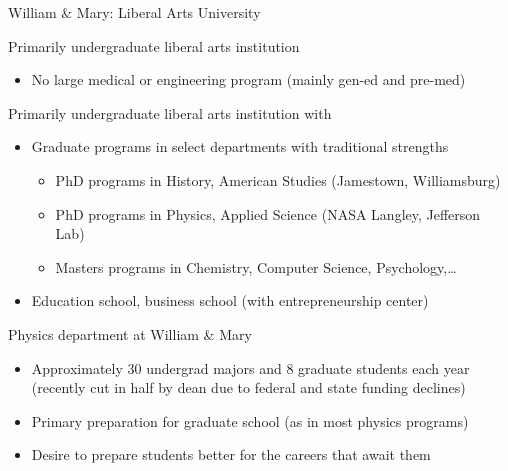 \documentclass[xcolor={dvipsnames},professionalfonts]{beamer}
\begin{document}
\begin{frame}{William \& Mary: Liberal Arts University}
 \begin{block}{Primarily undergraduate liberal arts institution}
  \begin{itemize}
   \item No large medical or engineering program (mainly gen-ed and pre-med)
  \end{itemize}
 \end{block}
 \begin{block}{Primarily undergraduate liberal arts institution with}
  \begin{itemize}
   \item Graduate programs in select departments with traditional strengths
    \begin{itemize}
     \item PhD programs in History, American Studies (Jamestown, Williamsburg)
     \item PhD programs in Physics, Applied Science (NASA Langley, Jefferson Lab)
     \item Masters programs in Chemistry, Computer Science, Psychology,\ldots
    \end{itemize}
   \item Education school, business school (with entrepreneurship center)
  \end{itemize}
 \end{block}
 \begin{block}{Physics department at William \& Mary}
  \begin{itemize}
   \item Approximately 30 undergrad majors and 8 graduate students each year (recently cut in half by dean due to federal and state funding declines)
   \item Primary preparation for graduate school (as in most physics programs)
   \item Desire to prepare students better for the careers that await them
  \end{itemize}
 \end{block}
\end{frame}
\end{document}
